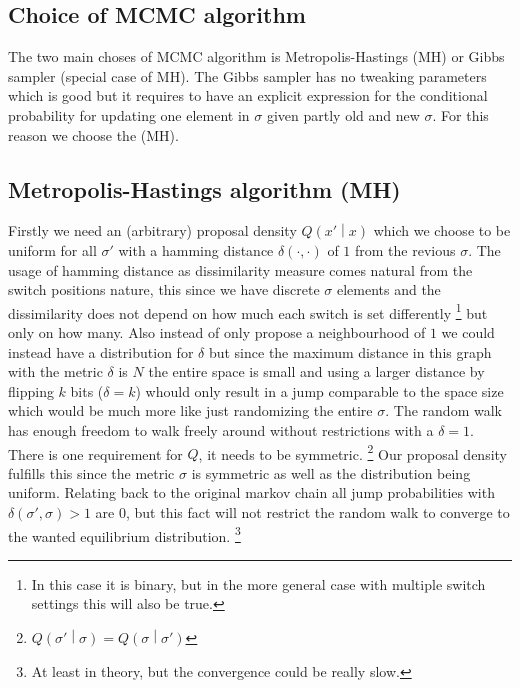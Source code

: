 \documentclass[a4paper,11pt]{kth-mag}
\begin{document}
            \subsection{Choice of MCMC algorithm}
                The two main choses of MCMC algorithm is Metropolis-Hastings (MH) 
                or Gibbs sampler (special case of MH).
                The Gibbs sampler has no tweaking parameters which is good but it 
                requires to have an explicit expression for the conditional 
                probability for updating one element in $\sigma$ given partly 
                old and new $\sigma$. For this reason we choose the (MH).
                
            \subsection{Metropolis-Hastings algorithm (MH)}
                Firstly we need an (arbitrary) proposal density $Q\left(x'\middle\vert x\right)$
                which we choose to be uniform for all $\sigma'$ 
                with a hamming distance $\delta\left(\cdot,\cdot\right)$ 
                of $1$ from the revious $\sigma$.
                The usage of hamming distance as dissimilarity measure comes natural 
                from the switch positions nature, this since we have 
                discrete $\sigma$ elements 
                and the dissimilarity does not depend on how much each switch is set 
                differently
                \footnote{In this case it is binary, but in the more general case with 
                multiple switch settings this will also be true.} 
                but only on how many.
                Also instead of only propose a neighbourhood of $1$ we could instead have a
                distribution for $\delta$ but since the maximum distance in this graph 
                with the metric $\delta$ is $N$ the entire space is small and using a 
                larger distance by flipping $k$ bits ($\delta=k$) whould only result in a jump 
                comparable to the space size which would be much more like 
                just randomizing the entire $\sigma$. The random walk has enough freedom to 
                walk freely around without restrictions with a $\delta=1$.
                There is one requirement for $Q$, it needs to be symmetric.
                \footnote{$Q\left(\sigma' \middle\vert \sigma\right)
                =Q\left(\sigma \middle\vert \sigma'\right) $}
                Our proposal density fulfills this since the metric $\sigma$ is symmetric 
                as well as the distribution being uniform.
                Relating back to the original markov chain all jump probabilities with 
                $\delta(\sigma',\sigma)>1$ are $0$, but this fact will not restrict the random
                walk to converge to the wanted equilibrium distribution.
                \footnote{At least in theory, but the convergence could be really slow.}
         
\end{document}
